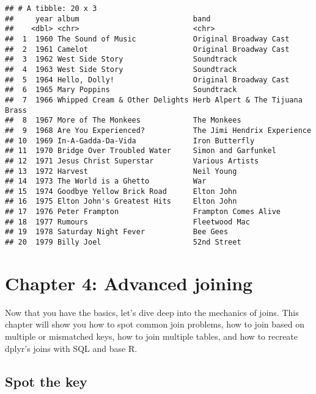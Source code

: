 \documentclass[]{article}
\begin{document}
\begin{verbatim}
## # A tibble: 20 x 3
##     year album                          band                           
##    <dbl> <chr>                          <chr>                          
##  1  1960 The Sound of Music             Original Broadway Cast         
##  2  1961 Camelot                        Original Broadway Cast         
##  3  1962 West Side Story                Soundtrack                     
##  4  1963 West Side Story                Soundtrack                     
##  5  1964 Hello, Dolly!                  Original Broadway Cast         
##  6  1965 Mary Poppins                   Soundtrack                     
##  7  1966 Whipped Cream & Other Delights Herb Alpert & The Tijuana Brass
##  8  1967 More of The Monkees            The Monkees                    
##  9  1968 Are You Experienced?           The Jimi Hendrix Experience    
## 10  1969 In-A-Gadda-Da-Vida             Iron Butterfly                 
## 11  1970 Bridge Over Troubled Water     Simon and Garfunkel            
## 12  1971 Jesus Christ Superstar         Various Artists                
## 13  1972 Harvest                        Neil Young                     
## 14  1973 The World is a Ghetto          War                            
## 15  1974 Goodbye Yellow Brick Road      Elton John                     
## 16  1975 Elton John's Greatest Hits     Elton John                     
## 17  1976 Peter Frampton                 Frampton Comes Alive           
## 18  1977 Rumours                        Fleetwood Mac                  
## 19  1978 Saturday Night Fever           Bee Gees                       
## 20  1979 Billy Joel                     52nd Street
\end{verbatim}

\section{Chapter 4: Advanced joining}\label{chapter-4-advanced-joining}

Now that you have the basics, let's dive deep into the mechanics of
joins. This chapter will show you how to spot common join problems, how
to join based on multiple or mismatched keys, how to join multiple
tables, and how to recreate dplyr's joins with SQL and base R.

\subsection{Spot the key}\label{spot-the-key}
\end{document}
